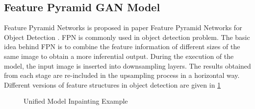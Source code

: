 \subsection{Feature Pyramid GAN Model}
Feature Pyramid Networks is proposed in paper Feature Pyramid Networks for Object Detection \cite{feature_pyramid}. FPN is commonly used in object detection problem. The basic idea behind FPN is to combine the feature information of different sizes of the same image to obtain a more inferential output. During the execution of the model, the input image is inserted into downsampling layers. The results obtained from each stage are re-included in the upsampling process in a horizontal way. Different versions of feature structures in object detection are given in \ref{fig:fpnstructs}

\begin{figure}[!ht]
    \centering
        \hspace{0.05\columnwidth}
        \hspace{0.05\columnwidth}
        \hspace{0.05\columnwidth}
        \vspace*{3mm}
        \caption{Unified Model Inpainting Example \cite{feature_pyramid}}
    \label{fig:fpnstructs}
\end{figure}

